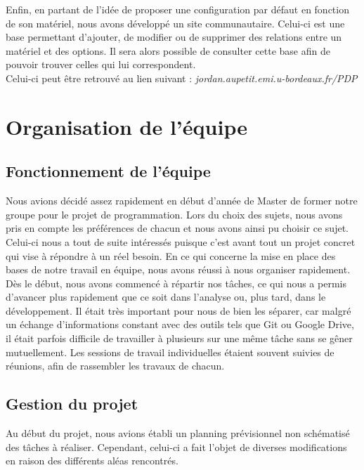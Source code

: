 ﻿\documentclass[17pts]{report}
\begin{document}
Enfin, en partant de l'idée de proposer une configuration par défaut en
fonction de son matériel, nous avons développé un site communautaire.  Celui-ci
est une base permettant d'ajouter, de modifier ou de supprimer des relations
entre un matériel et des options. Il sera alors possible de consulter cette
base afin de pouvoir trouver celles qui lui correspondent.\\
Celui-ci peut être retrouvé au lien suivant :
\textit{jordan.aupetit.emi.u-bordeaux.fr/PDP}

\chapter{Organisation de l'équipe}\thispagestyle{IHA-fancy-style}
\label{cha:Organisation de l'équipe}
    \section{Fonctionnement de l'équipe}
    \label{sec:Fonctionnement de l'équipe}

Nous avions décidé assez rapidement en début d'année de Master de former notre
groupe pour le projet de programmation. Lors du choix des sujets, nous avons
pris en compte les préférences de chacun et nous avons ainsi pu choisir ce
sujet. Celui-ci nous a tout de suite intéressés puisque c'est avant tout un
projet concret qui vise à répondre à un réel besoin.  En ce qui concerne la
mise en place des bases de notre travail en équipe, nous avons réussi à nous
organiser rapidement.  \\

Dès le début, nous avons commencé à répartir nos tâches, ce qui nous a permis
d’avancer plus rapidement que ce soit dans l’analyse ou, plus tard, dans le
développement. Il était très important pour nous de bien les séparer, car malgré
un échange d’informations constant avec des outils tels que Git ou Google
Drive, il était parfois difficile de travailler à plusieurs sur une même tâche
sans se gêner mutuellement. Les sessions de travail individuelles étaient
souvent suivies de réunions, afin de rassembler les travaux de chacun.  \\

\section{Gestion du projet}
\label{sec:Gestion du projet}
Au début du projet, nous avions établi un planning prévisionnel non schématisé
des tâches à réaliser. Cependant, celui-ci a fait l'objet de diverses
modifications en raison des différents aléas rencontrés.
\end{document}
